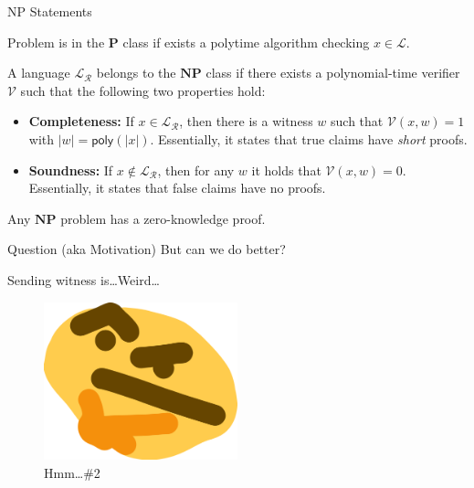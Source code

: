 \documentclass{zkdl-presentation-template}
\begin{document}
    \begin{frame}{NP Statements}
        \begin{definition}[P Language]
            Problem is in the $\mathbf{P}$ class if exists a polytime algorithm checking $x \in \mathcal{L}$.
        \end{definition}

        \begin{definition}[NP Language]
            A language $\mathcal{L}_{\mathcal{R}}$ belongs to the $\mathbf{NP}$ class if there exists a polynomial-time verifier $\mathcal{V}$ such that the following two properties hold:
            \begin{itemize}
                \item \textbf{Completeness:} If $x \in \mathcal{L}_{\mathcal{R}}$, then there is a witness $w$ such that $\mathcal{V}(x, w) = 1$ with $|w| = \mathsf{poly}(|x|)$. Essentially, it states that true claims have \textit{short} proofs.
                \item \textbf{Soundness:} If $x \not\in \mathcal{L}_{\mathcal{R}}$, then for any $w$ it holds that $\mathcal{V}(x, w) = 0$. Essentially, it states that false claims have no proofs.
            \end{itemize}
        \end{definition}

        \begin{theorem}
            Any $\mathbf{NP}$ problem has a zero-knowledge proof.
        \end{theorem}
    \end{frame}

    \begin{frame}{Question (aka Motivation)}
        But can we do better?

        Sending witness is\ldots Weird\ldots

        \begin{figure}
            \centering
            \includegraphics[width=0.5\textwidth]{images/lecture_6/thonk.png}
            \caption{Hmm\ldots \#2}
        \end{figure}
    \end{frame}
\end{document}
